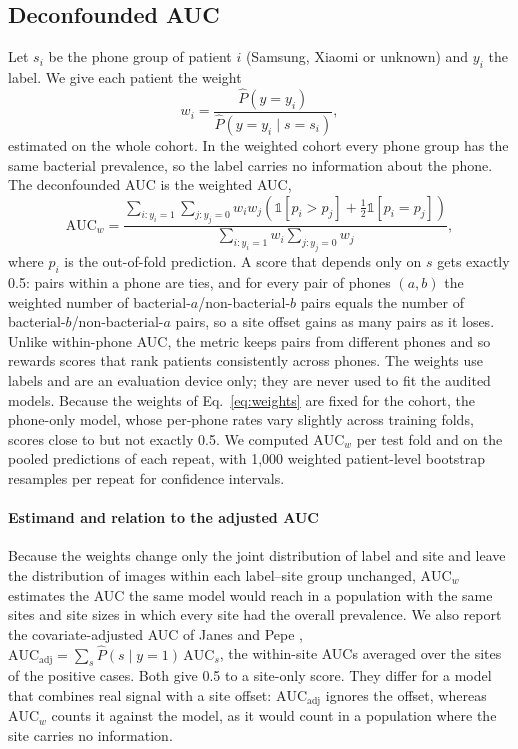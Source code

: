 \documentclass[preprint,12pt]{elsarticle}
\begin{document}
\subsection{Deconfounded AUC}
\label{sec:deconf}

Let $s_i$ be the phone group of patient $i$ (Samsung, Xiaomi or unknown) and $y_i$ the label. We give each patient the weight
\begin{equation}
w_i = \frac{\hat P(y = y_i)}{\hat P(y = y_i \mid s = s_i)},
\label{eq:weights}
\end{equation}
estimated on the whole cohort. In the weighted cohort every phone group has the same bacterial prevalence, so the label carries no information about the phone. The deconfounded AUC is the weighted AUC,
\begin{equation}
\mathrm{AUC}_{w} = \frac{\sum_{i: y_i = 1} \sum_{j: y_j = 0} w_i w_j \left( \mathbb{1}[p_i > p_j] + \tfrac{1}{2}\mathbb{1}[p_i = p_j] \right)}{\sum_{i: y_i = 1} w_i \sum_{j: y_j = 0} w_j},
\label{eq:deconf}
\end{equation}
where $p_i$ is the out-of-fold prediction. A score that depends only on $s$ gets exactly 0.5: pairs within a phone are ties, and for every pair of phones $(a, b)$ the weighted number of bacterial-$a$/non-bacterial-$b$ pairs equals the number of bacterial-$b$/non-bacterial-$a$ pairs, so a site offset gains as many pairs as it loses. Unlike within-phone AUC, the metric keeps pairs from different phones and so rewards scores that rank patients consistently across phones. The weights use labels and are an evaluation device only; they are never used to fit the audited models. Because the weights of Eq.~\eqref{eq:weights} are fixed for the cohort, the phone-only model, whose per-phone rates vary slightly across training folds, scores close to but not exactly 0.5. We computed $\mathrm{AUC}_{w}$ per test fold and on the pooled predictions of each repeat, with 1,000 weighted patient-level bootstrap resamples per repeat for confidence intervals.

\paragraph{Estimand and relation to the adjusted AUC} Because the weights change only the joint distribution of label and site and leave the distribution of images within each label--site group unchanged, $\mathrm{AUC}_w$ estimates the AUC the same model would reach in a population with the same sites and site sizes in which every site had the overall prevalence. We also report the covariate-adjusted AUC of Janes and Pepe \cite{janes2008adjusting}, $\mathrm{AUC}_{\text{adj}} = \sum_s \hat P(s \mid y = 1)\, \mathrm{AUC}_s$, the within-site AUCs averaged over the sites of the positive cases. Both give 0.5 to a site-only score. They differ for a model that combines real signal with a site offset: $\mathrm{AUC}_{\text{adj}}$ ignores the offset, whereas $\mathrm{AUC}_w$ counts it against the model, as it would count in a population where the site carries no information.
\end{document}
